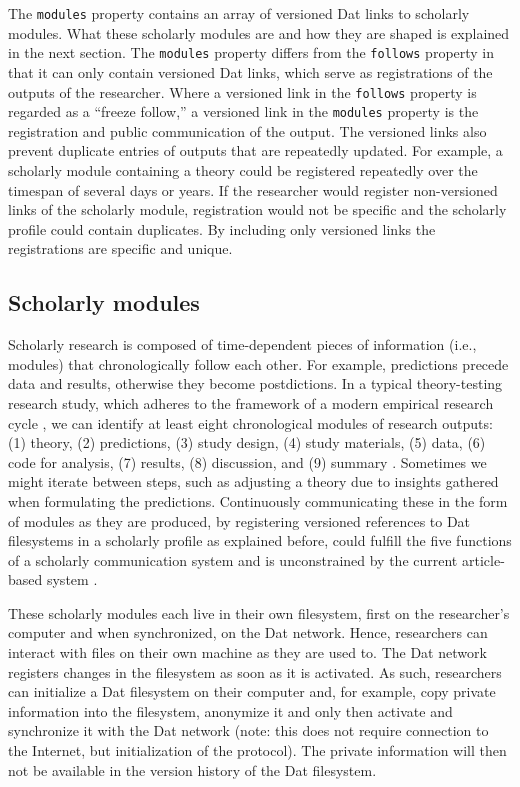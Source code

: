\documentclass[publications,article,submit,moreauthors,pdftex,10pt,a4paper]{Definitions/mdpi}
\begin{document}
The \texttt{modules} property contains an array of versioned Dat links
to scholarly modules. What these scholarly modules are and how they are
shaped is explained in the next section. The \texttt{modules} property
differs from the \texttt{follows} property in that it can only contain
versioned Dat links, which serve as registrations of the outputs of the
researcher. Where a versioned link in the \texttt{follows} property is
regarded as a ``freeze follow,'' a versioned link in the
\texttt{modules} property is the registration and public communication
of the output. The versioned links also prevent duplicate entries of
outputs that are repeatedly updated. For example, a scholarly module
containing a theory could be registered repeatedly over the timespan of
several days or years. If the researcher would register non-versioned
links of the scholarly module, registration would not be specific and
the scholarly profile could contain duplicates. By including only
versioned links the registrations are specific and unique.

\subsection*{Scholarly modules}\label{scholarly-modules}

Scholarly research is composed of time-dependent pieces of information
(i.e., modules) that chronologically follow each other. For example,
predictions precede data and results, otherwise they become
postdictions. In a typical theory-testing research study, which
adheres to the framework of a modern empirical research cycle
\citep{isbn:9789023228912}, we can identify at least eight
chronological modules of research outputs: (1) theory, (2)
predictions, (3) study design, (4) study materials, (5) data, (6) code
for analysis, (7) results, (8) discussion, and (9) summary
\citep[these are examples and modules should not be limited to these
  to prevent homogenization of scholarly
  outputs;][]{doi:10.1111/j.1467-954X.1990.tb03347.x}. Sometimes we
might iterate between steps, such as adjusting a theory due to
insights gathered when formulating the predictions.  Continuously
communicating these in the form of modules as they are produced, by
registering versioned references to Dat filesystems in a scholarly
profile as explained before, could fulfill the five functions of a
scholarly communication system and is unconstrained by the current
article-based system \citep[see
  also][]{doi:10.3390/publications6020021}.

These scholarly modules each live in their own filesystem, first on the
researcher's computer and when synchronized, on the Dat network. Hence,
researchers can interact with files on their own machine as they are
used to. The Dat network registers changes in the filesystem as soon as
it is activated. As such, researchers can initialize a Dat filesystem on
their computer and, for example, copy private information into the
filesystem, anonymize it and only then activate and synchronize it with
the Dat network (note: this does not require connection to the Internet,
but initialization of the protocol). The private information will then
not be available in the version history of the Dat filesystem.
\end{document}
